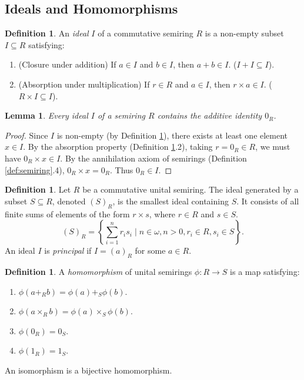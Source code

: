 \documentclass[11pt, a4paper]{article}
\theoremstyle{plain}
\newtheorem{lemma}[theorem]{Lemma}
\theoremstyle{definition}
\newtheorem{definition}[theorem]{Definition}
\numberwithin{equation}{section}
\begin{document}
\subsection{Ideals and Homomorphisms}

\begin{definition}\label{def:ideal}
An \emph{ideal} $I$ of a commutative semiring $R$ is a non-empty subset $I \subseteq R$ satisfying:
\begin{enumerate}
    \item (Closure under addition) If $a \in I$ and $b \in I$, then $a+b \in I$. ($I+I \subseteq I$).
    \item (Absorption under multiplication) If $r \in R$ and $a \in I$, then $r\times a \in I$. ($R\times I \subseteq I$).
\end{enumerate}
\end{definition}

\begin{lemma}\label{lem:zero_in_ideal}
Every ideal $I$ of a semiring $R$ contains the additive identity $0_R$.
\end{lemma}
\begin{proof}
Since $I$ is non-empty (by Definition \ref{def:ideal}), there exists at least one element $x \in I$. By the absorption property (Definition \ref{def:ideal}.2), taking $r=0_R \in R$, we must have $0_R \times x \in I$. By the annihilation axiom of semirings (Definition \ref{def:semiring}.4), $0_R \times x = 0_R$. Thus $0_R \in I$.
\end{proof}

\begin{definition}
Let $R$ be a commutative unital semiring. The ideal generated by a subset $S \subseteq R$, denoted $(S)_R$, is the smallest ideal containing $S$. It consists of all finite sums of elements of the form $r\times s$, where $r \in R$ and $s \in S$.
\begin{equation}
    (S)_R = \left\{ \sum_{i=1}^n r_i s_i \mid n \in \omega, n>0, r_i \in R, s_i \in S \right\}.
\end{equation}
An ideal $I$ is \emph{principal} if $I=(a)_R$ for some $a \in R$.
\end{definition}

\begin{definition}
A \emph{homomorphism} of unital semirings $\phi: R \to S$ is a map satisfying:
\begin{enumerate}
    \item $\phi(a+_{R} b) = \phi(a)+_{S} \phi(b)$.
    \item $\phi(a\times_{R} b) = \phi(a)\times_{S} \phi(b)$.
    \item $\phi(0_R) = 0_S$.
    \item $\phi(1_R) = 1_S$.
\end{enumerate}
An isomorphism is a bijective homomorphism.
\end{definition}
\end{document}
